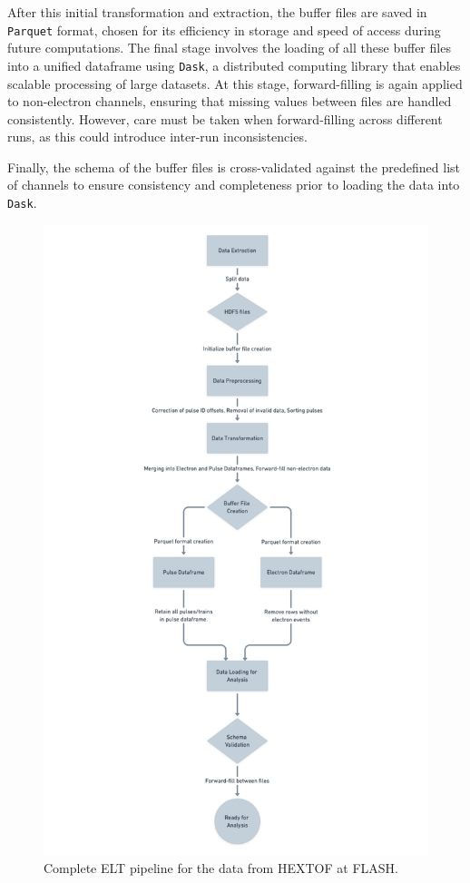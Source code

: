 After this initial transformation and extraction, the buffer files are saved in \texttt{Parquet} format, chosen for its efficiency in storage and speed of access during future computations. The final stage involves the loading of all these buffer files into a unified dataframe using \texttt{Dask}, a distributed computing library that enables scalable processing of large datasets. At this stage, forward-filling is again applied to non-electron channels, ensuring that missing values between files are handled consistently. However, care must be taken when forward-filling across different runs, as this could introduce inter-run inconsistencies.

Finally, the schema of the buffer files is cross-validated against the predefined list of channels to ensure consistency and completeness prior to loading the data into \texttt{Dask}.

\begin{figure}[H]
    \label{fig:elt}
    \centering
    \includegraphics[width=0.7\linewidth]{images/elt_cropped.png}
    \caption{Complete \gls{ELT} pipeline for the data from \gls{HEXTOF} at \gls{FLASH}.}
\end{figure}

